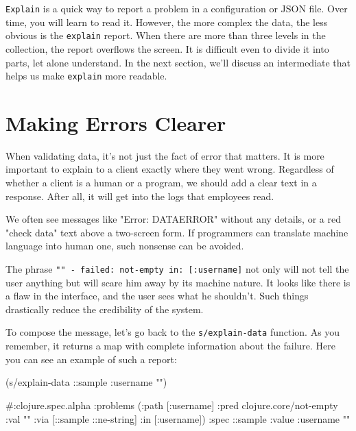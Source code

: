 \verb|Explain| is a quick way to report a problem in a configuration or JSON file. Over time, you will learn to read it. However, the more complex the data, the less obvious is the \verb|explain| report. When there are more than three levels in the collection, the report overflows the screen. It is difficult even to divide it into parts, let alone understand. In the next section, we'll discuss an intermediate that helps us make \verb|explain| more readable.

\section{Making Errors Clearer}


\label{spec-messages}

When validating data, it's not just the fact of error that matters. It is more important to explain to a client exactly where they went wrong. Regardless of whether a client is a human or a program, we should add a clear text in a response. After all, it will get into the logs that employees read.

We often see messages like "Error: DATAERROR" without any details, or a red "check data" text above a two-screen form. If programmers can translate machine language into human one, such nonsense can be avoided.


The phrase \texttt{"" - failed: not-empty in: [:user\-name]} not only will not tell the user anything but will scare him away by its machine nature. It looks like there is a flaw in the interface, and the user sees what he shouldn't. Such things drastically reduce the credibility of the system.

To compose the message, let's go back to the \verb|s/explain-data| function. As you remember, it returns a map with complete information about the failure. Here you can see an example of such a report:

\begin{english}
  \begin{clojure}
(s/explain-data ::sample {:username ""})

#:clojure.spec.alpha
{:problems
 ({:path [:username]
   :pred clojure.core/not-empty
 :val ""
   :via [::sample ::ne-string]
   :in [:username]})
 :spec ::sample
 :value {:username ""}}
  \end{clojure}
\end{english}


